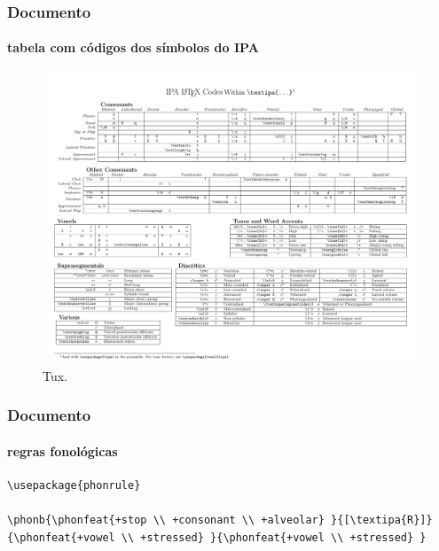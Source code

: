 \begin{frame}[fragile]
\frametitle{Documento}
\framesubtitle{tabela com códigos dos símbolos do IPA}
\vspace{-4ex}
\begin{figure}[h!]
  \centering
  \label{fig:tux}
  \includegraphics[width=\textwidth]
                     {figures/tipachart_mod.pdf}
  \caption{Tux.}
\end{figure}
\end{frame}



\begin{frame}[fragile]
\frametitle{Documento}
\framesubtitle{regras fonológicas}
  \scriptsize
  \begin{verbatim}
\usepackage{phonrule}
  
\phonb{\phonfeat{+stop \\ +consonant \\ +alveolar} }{[\textipa{R}]}
{\phonfeat{+vowel \\ +stressed} }{\phonfeat{+vowel \\ +stressed} }
  \end{verbatim}

  \begin{fmpage}{\textwidth}
  \end{fmpage}

\end{frame}


